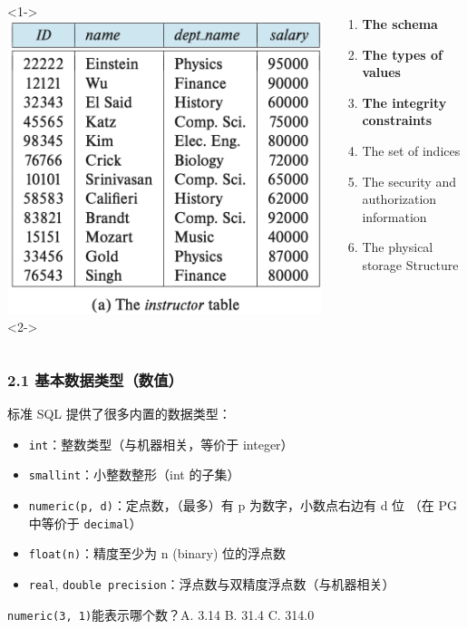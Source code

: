 \documentclass[aspectratio=169, 14pt]{beamer}
\begin{document}
\begin{frame}
\begin{columns}
    <1->
    \includegraphics[height=.68\paperheight]{table/instructor}
    <2->
    \begin{enumerate}
        \item \textbf{The schema}
        \item \textbf{The types of values}
        \item \textbf{The integrity constraints}
        \item The set of indices
        \item The security and authorization information
        \item The physical storage Structure
    \end{enumerate}
\end{columns}

    

\end{frame}

\begin{frame}
    \frametitle{2.1 基本数据类型（数值）}
标准 SQL 提供了很多内置的数据类型：
\begin{itemize}
    \item \texttt{int}：整数类型（与机器相关，等价于 integer）
    \item \texttt{smallint}：小整数整形（int 的子集）
    \item \texttt{numeric(p, d)}：定点数，（最多）有 p 为数字，小数点右边有 d 位 （在 PG 中等价于 \texttt{decimal}）
    \item \texttt{float(n)}：精度至少为 n (binary) 位的浮点数
    \item \texttt{real}, \texttt{double precision}：浮点数与双精度浮点数（与机器相关）
\end{itemize}
\pause
{\large {}} \texttt{numeric(3, 1)}能表示哪个数？A. 3.14 B. 31.4 C. 314.0
\end{frame}
\end{document}
